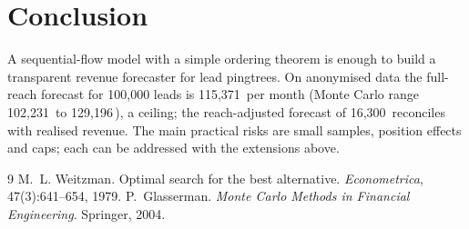 \documentclass[10pt,a4paper]{article}
\begin{document}
\section{Conclusion}
A sequential-flow model with a simple ordering theorem is enough to build a transparent revenue forecaster for lead pingtrees. On anonymised data the full-reach forecast for 100{,}000 leads is 115,371\,\texteuro{} per month (Monte Carlo range 102,231\,\texteuro{} to 129,196\,\texteuro{}), a ceiling; the reach-adjusted forecast of 16,300\,\texteuro{} reconciles with realised revenue. The main practical risks are small samples, position effects and caps; each can be addressed with the extensions above.

\begin{thebibliography}{9}
 M.~L. Weitzman. Optimal search for the best alternative. \emph{Econometrica}, 47(3):641--654, 1979.
 P.~Glasserman. \emph{Monte Carlo Methods in Financial Engineering}. Springer, 2004.
\end{thebibliography}
\end{document}
